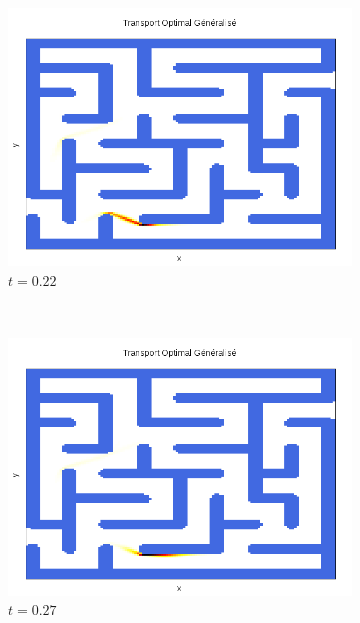 \documentclass[a4paper,12pt]{article}
\begin{document}
\begin{figure}[!h]
\begin{subfigure}[b]{0.23\linewidth}
\includegraphics[width=\linewidth]{img/2DLabyrinthe/T_00023.png}
\caption*{$t=0.22$}
\end{subfigure}
~
\begin{subfigure}[b]{0.23\linewidth}
\includegraphics[width=\linewidth]{img/2DLabyrinthe/T_00028.png}
\caption*{$t=0.27$}
\end{subfigure}
~
\begin{subfigure}[b]{0.23\linewidth}

\end{subfigure}
\end{figure}
\end{document}
